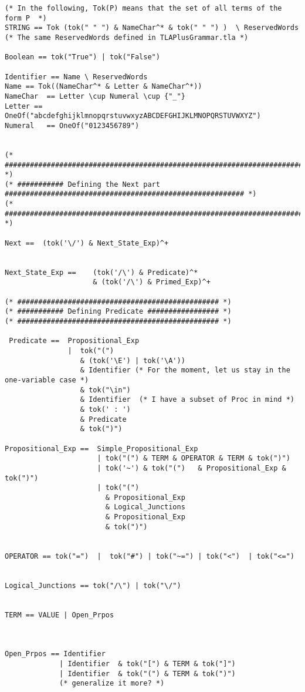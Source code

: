 \documentclass{article}
\theoremstyle{plain}
\numberwithin{equation}{section}
\begin{document}
\begin{lstlisting}
(* In the following, Tok(P) means that the set of all terms of the form P  *)
STRING == Tok (tok(" " ") & NameChar^* & tok(" " ") )  \ ReservedWords (* The same ReservedWords defined in TLAPlusGrammar.tla *)

Boolean == tok("True") | tok("False")

Identifier == Name \ ReservedWords
Name == Tok((NameChar^* & Letter & NameChar^*))
NameChar  == Letter \cup Numeral \cup {"_"}  
Letter == OneOf("abcdefghijklmnopqrstuvwxyzABCDEFGHIJKLMNOPQRSTUVWXYZ")
Numeral   == OneOf("0123456789") 


(* ############################################################################################ *)
(* ########### Defining the Next part ######################################################### *)
(* ############################################################################################ *)

Next ==  (tok('\/') & Next_State_Exp)^+


Next_State_Exp ==    (tok('/\') & Predicate)^*
                     & (tok('/\') & Primed_Exp)^+

(* ################################################ *)
(* ########### Defining Predicate ################# *)
(* ################################################ *)
 
 Predicate ==  Propositional_Exp         
               |  tok("(") 
                  & (tok('\E') | tok('\A'))  
                  & Identifier (* For the moment, let us stay in the one-variable case *)
                  & tok("\in")
                  & Identifier  (* I have a subset of Proc in mind *)
                  & tok(' : ') 
                  & Predicate
                  & tok(")")
                  
Propositional_Exp ==  Simple_Propositional_Exp 
                      | tok("(") & TERM & OPERATOR & TERM & tok(")")
                      | tok('~') & tok("(")   & Propositional_Exp & tok(")")
                      | tok("(")   
                        & Propositional_Exp  
                        & Logical_Junctions
                        & Propositional_Exp
                        & tok(")")


OPERATOR == tok("=")  |  tok("#") | tok("~=") | tok("<")  | tok("<=")


Logical_Junctions == tok("/\") | tok("\/")


TERM == VALUE | Open_Prpos



Open_Prpos == Identifier    
             | Identifier  & tok("[") & TERM & tok("]")
             | Identifier  & tok("(") & TERM & tok(")")
             (* generalize it more? *)
             

\end{lstlisting}
\end{document}
